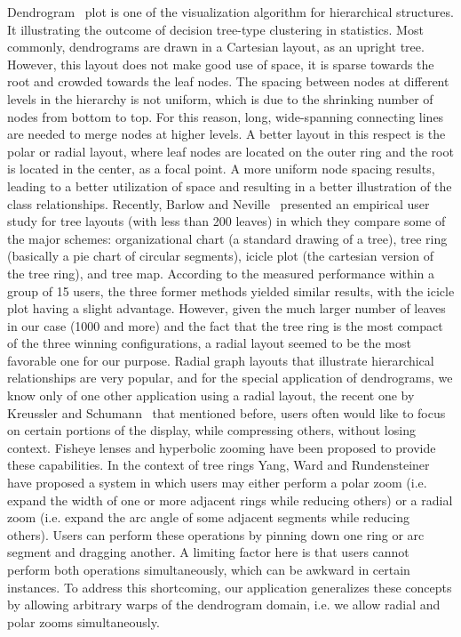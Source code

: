 Dendrogram~\cite{Dendrogram} plot is one of the visualization algorithm for hierarchical structures. It illustrating the outcome of decision tree-type clustering in statistics. Most commonly, dendrograms are drawn in a Cartesian layout, as an upright tree. However, this layout does not make good use of space, it is sparse towards the root and crowded towards the leaf nodes. The spacing between nodes at different levels in the hierarchy is not uniform, which is due to the shrinking number of nodes from bottom to top. For this reason, long, wide-spanning connecting lines are needed to merge nodes at higher levels. A better layout in this respect is the polar or radial layout, where leaf nodes are located on the outer ring and the root is located in the center, as a focal point. A more uniform node spacing results, leading to a better utilization of space and resulting in a better illustration of the class relationships. Recently, Barlow and Neville~\cite{Barlow_Neville} presented an empirical user study for tree layouts (with less than 200 leaves) in which they compare some of the major schemes: organizational chart (a standard drawing of a tree), tree ring (basically a pie chart of circular segments), icicle plot (the cartesian version of the tree ring), and tree map. According to the measured performance within a group of 15 users, the three former methods yielded similar results, with the icicle plot having a slight advantage. However, given the much larger number of leaves in our case (1000 and more) and the fact that the tree ring is the most compact of the three winning configurations, a radial layout seemed to be the most favorable one for our purpose. Radial graph layouts that illustrate hierarchical relationships are very popular, and for the special application of dendrograms, we know only of one other application using a radial layout, the recent one by Kreussler and Schumann~\cite{Kreussler_Schumann} that mentioned before, users often would like to focus on certain portions of the display, while compressing others, without losing context. Fisheye lenses and hyperbolic zooming have been proposed to provide these capabilities. In the context of tree rings Yang, Ward and Rundensteiner~\cite{Yang_Ward} have proposed a system in which users may either perform a polar zoom (i.e. expand the width of one or more adjacent rings while reducing others) or a radial zoom (i.e. expand the arc angle of some adjacent segments while reducing others). Users can perform these operations by pinning down one ring or arc segment and dragging another. A limiting factor here is that users cannot perform both operations simultaneously, which can be awkward in certain instances. To address this shortcoming, our application generalizes these concepts by allowing arbitrary warps of the dendrogram domain, i.e. we allow radial and polar zooms simultaneously.


